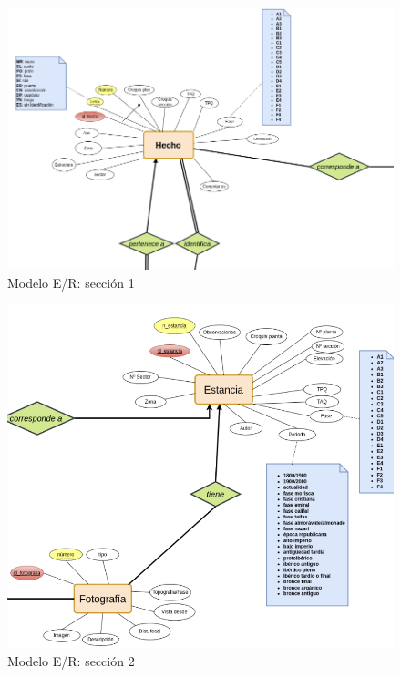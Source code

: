         \begin{figure}[H]
            \centering
            \includegraphics[scale=0.40]{imagenes/E-R1.png}
            \caption{Modelo E/R: sección 1}
            \label{fig:e-rmodel1}
        \end{figure}

        \begin{figure}[H]
            \centering
            \includegraphics[scale=0.40]{imagenes/E-R2.png}
            \caption{Modelo E/R: sección 2}
            \label{fig:e-rmodel2}
        \end{figure}

